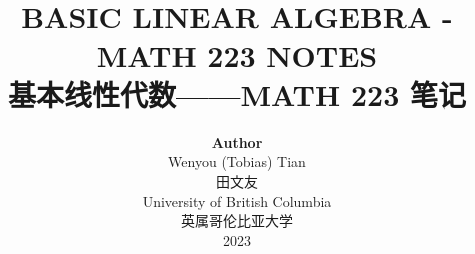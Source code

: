 
\title{ \normalsize \textsc{}
		\\ [2.0cm]
		\HRule{1.5pt} \\
		\LARGE \textbf{\uppercase{Basic Linear Algebra - MATH 223 Notes}
		\HRule{2.0pt} \\ [0.6cm] \LARGE{基本线性代数——MATH 223 笔记} \vspace*{10\baselineskip}}
		}
\date{}
\author{\textbf{Author} \\ 
		Wenyou (Tobias) Tian \\ 田文友 \\
		University of British Columbia \\ 英属哥伦比亚大学 \\
		2023}

\maketitle
\newpage

\tableofcontents
\newpage